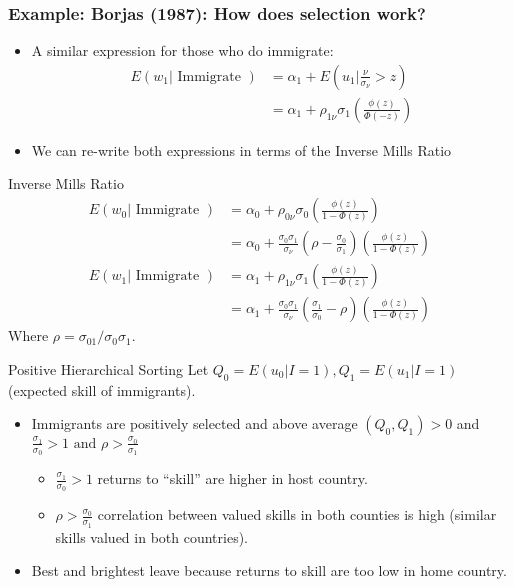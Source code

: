 \documentclass[xcolor=pdftex,dvipsnames,table,mathserif,aspectratio=169]{beamer}
\begin{document}
\begin{frame}
\frametitle{Example: Borjas (1987): How does selection work?}
\begin{itemize}
\item A similar expression for those who do immigrate:
\begin{align*}
E\left(w_{1} | \text { Immigrate }\right) &=\alpha_{1}+E\left(u_{1} | \frac{\nu}{\sigma_{\nu}}>z\right) \\
&=\alpha_{1}+\rho_{1 \nu} \sigma_{1}\left(\frac{\phi(z)}{\Phi(-z)}\right)
\end{align*}
\item We can re-write both expressions in terms of the \alert{Inverse Mills Ratio}
\end{itemize}
\end{frame}

\begin{frame}{Inverse Mills Ratio}
\begin{align*}
E\left(w_{0} | \text { Immigrate }\right) &=\alpha_{0}+\rho_{0 \nu} \sigma_{0}\left(\frac{\phi(z)}{1-\Phi(z)}\right) \\
&=\alpha_{0}+\frac{\sigma_{0} \sigma_{1}}{\sigma_{\nu}}\left(\rho-\frac{\sigma_{0}}{\sigma_{1}}\right)\left(\frac{\phi(z)}{1-\Phi(z)}\right) \\
E\left(w_{1} | \text { Immigrate }\right) &=\alpha_{1}+\rho_{1 \nu} \sigma_{1}\left(\frac{\phi(z)}{1-\Phi(z)}\right) \\
&=\alpha_{1}+\frac{\sigma_{0} \sigma_{1}}{\sigma_{\nu}}\left(\frac{\sigma_{1}}{\sigma_{0}}-\rho\right)\left(\frac{\phi(z)}{1-\Phi(z)}\right)
\end{align*}
Where $\rho=\sigma_{01} / \sigma_{0} \sigma_{1}$.
\end{frame}



\begin{frame}{Positive Hierarchical Sorting}
Let $Q_{0}=E\left(u_{0} | I=1\right), Q_{1}=E\left(u_{1} | I=1\right)$ (expected \alert{skill} of immigrants).
\begin{itemize}
\item Immigrants are positively selected and above average $(Q_0,Q_1) > 0$ and $\frac{\sigma_{1}}{\sigma_{0}}>1 \text { and } \rho>\frac{\sigma_{0}}{\sigma_{1}}$
\begin{itemize}
\item $\frac{\sigma_{1}}{\sigma_{0}}>1$ returns to ``skill'' are higher in host country.
\item $\rho>\frac{\sigma_{0}}{\sigma_{1}}$ correlation between valued skills in both counties is high (similar skills valued in both countries).
\end{itemize}
\item Best and brightest leave because returns to skill are too low in home country.
\end{itemize}
\end{frame}
\end{document}
